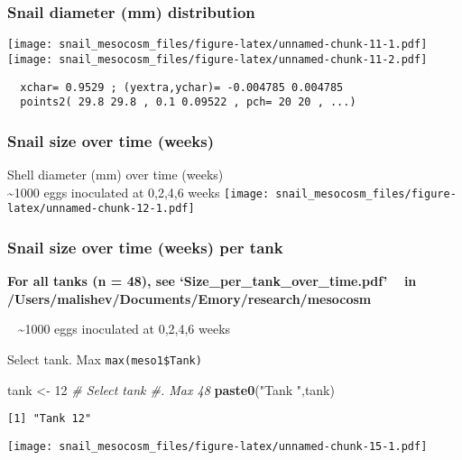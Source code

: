 \documentclass[10,portrait]{article}
\newenvironment{Shaded}{\begin{snugshade}}{\end{snugshade}}
\newcommand{\KeywordTok}[1]{\textcolor[rgb]{0.13,0.29,0.53}{\textbf{#1}}}
\newcommand{\DecValTok}[1]{\textcolor[rgb]{0.00,0.00,0.81}{#1}}
\newcommand{\StringTok}[1]{\textcolor[rgb]{0.31,0.60,0.02}{#1}}
\newcommand{\CommentTok}[1]{\textcolor[rgb]{0.56,0.35,0.01}{\textit{#1}}}
\newcommand{\NormalTok}[1]{#1}
\begin{document}
\subsubsection{Snail diameter (mm)
distribution}\label{snail-diameter-mm-distribution}

\texttt{[image: snail\_mesocosm\_files/figure-latex/unnamed-chunk-11-1.pdf]}
\texttt{[image: snail\_mesocosm\_files/figure-latex/unnamed-chunk-11-2.pdf]}

\begin{verbatim}
  xchar= 0.9529 ; (yextra,ychar)= -0.004785 0.004785 
  points2( 29.8 29.8 , 0.1 0.09522 , pch= 20 20 , ...) 
\end{verbatim}

\subsubsection{Snail size over time
(weeks)}\label{snail-size-over-time-weeks}

Shell diameter (mm) over time (weeks)\\
\textasciitilde{}1000 eggs inoculated at 0,2,4,6 weeks
\texttt{[image: snail\_mesocosm\_files/figure-latex/unnamed-chunk-12-1.pdf]}

\subsubsection{Snail size over time (weeks) per
tank}\label{snail-size-over-time-weeks-per-tank}

\textbf{For all tanks (n = 48), see `Size\_per\_tank\_over\_time.pdf' ~
in /Users/malishev/Documents/Emory/research/mesocosm}

~ \textasciitilde{}1000 eggs inoculated at 0,2,4,6 weeks

Select tank. Max \texttt{max(meso1\$Tank)}

\begin{Shaded}
\begin{Highlighting}[]
\NormalTok{tank <-}\StringTok{ }\DecValTok{12} \CommentTok{# Select tank #. Max 48   }
\KeywordTok{paste0}\NormalTok{(}\StringTok{"Tank "}\NormalTok{,tank) }
\end{Highlighting}
\end{Shaded}

\begin{verbatim}
[1] "Tank 12"
\end{verbatim}

\texttt{[image: snail\_mesocosm\_files/figure-latex/unnamed-chunk-15-1.pdf]}
\end{document}
